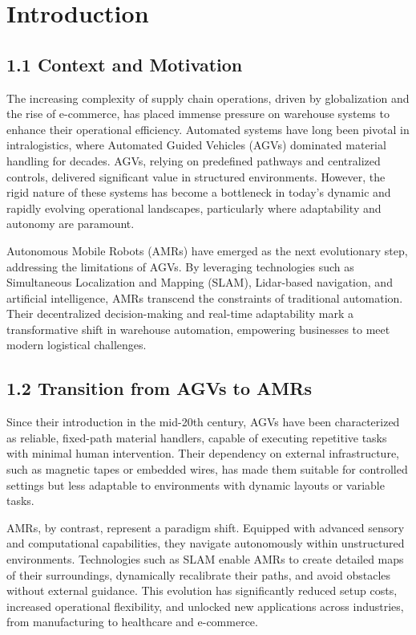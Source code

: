\documentclass[conference]{IEEEtran}
\begin{document}
\section{Introduction}

\subsection*{\textbf{1.1 Context and Motivation}}
The increasing complexity of supply chain operations, driven by globalization and the rise of e-commerce, has placed immense pressure on warehouse systems to enhance their operational efficiency. Automated systems have long been pivotal in intralogistics, where Automated Guided Vehicles (AGVs) dominated material handling for decades. AGVs, relying on predefined pathways and centralized controls, delivered significant value in structured environments. However, the rigid nature of these systems has become a bottleneck in today’s dynamic and rapidly evolving operational landscapes, particularly where adaptability and autonomy are paramount.

Autonomous Mobile Robots (AMRs) have emerged as the next evolutionary step, addressing the limitations of AGVs. By leveraging technologies such as Simultaneous Localization and Mapping (SLAM), Lidar-based navigation, and artificial intelligence, AMRs transcend the constraints of traditional automation. Their decentralized decision-making and real-time adaptability mark a transformative shift in warehouse automation, empowering businesses to meet modern logistical challenges.

\subsection*{\textbf{1.2 Transition from AGVs to AMRs}}
Since their introduction in the mid-20th century, AGVs have been characterized as reliable, fixed-path material handlers, capable of executing repetitive tasks with minimal human intervention. Their dependency on external infrastructure, such as magnetic tapes or embedded wires, has made them suitable for controlled settings but less adaptable to environments with dynamic layouts or variable tasks.

AMRs, by contrast, represent a paradigm shift. Equipped with advanced sensory and computational capabilities, they navigate autonomously within unstructured environments. Technologies such as SLAM enable AMRs to create detailed maps of their surroundings, dynamically recalibrate their paths, and avoid obstacles without external guidance. This evolution has significantly reduced setup costs, increased operational flexibility, and unlocked new applications across industries, from manufacturing to healthcare and e-commerce.
\end{document}
